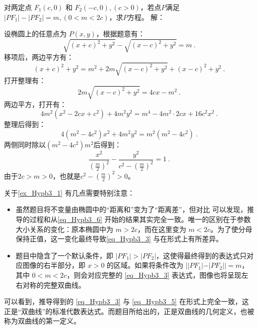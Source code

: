 \begin{example}{对两定点 $F_1(c, 0)$ 和 $F_2(-c, 0),(c>0)$，若点$P$满足$|PF_1| - |PF_2| = m,(0<m <2c)$，求$P$方程。}
解：

设椭圆上的任意点为 $P(x, y)$，根据题意有：
\begin{equation}
\sqrt{(x + c)^2 + y^2} - \sqrt{(x - c)^2 + y^2} = m~.
\end{equation}
移项后，两边平方有：
\begin{equation}
(x + c)^2 + y^2 = m^2 + 2m\sqrt{(x - c)^2 + y^2} + (x - c)^2 + y^2~.
\end{equation}
打开整理有：
\begin{equation}
2m\sqrt{(x - c)^2 + y^2}= 4cx - m^2~.
\end{equation}
两边平方，打开有：
\begin{equation}\label{eq_Hypb3_6}
4m^2(x^2 - 2cx+c^2) + 4m^2y^2= m^4-4m^2\cdot2cx+16c^2x^2~.
\end{equation}
整理后得到：
\begin{equation}
4(m^2 -4c^2)x^2 + 4m^2y^2= m^2(m^2-4c^2)~.
\end{equation}
两侧同时除以$(m^2-4c^2)m^2$后得到：
\begin{equation}\label{eq_Hypb3_3}
\frac{x^2}{\left(\displaystyle\frac{m}{2}\right)^2} -\frac{y^2}{\displaystyle c^2-\left(\frac{m}{2}\right)^2}=1~.
\end{equation}
由于$2c>m>0$，也就是$\displaystyle c^2-\left(\frac{m}{2}\right)^2>0$。
\end{example}

关于\autoref{ex_Hypb3_1} 有几点需要特别注意：
\begin{itemize}
\item 虽然题目将不变量由椭圆中的“距离和”变为了“距离差”，但对比  可以发现，推导的过程和从\autoref{eq_Hypb3_6} 开始的结果其实完全一致。唯一的区别在于参数大小关系的变化：原本椭圆中为 $m > 2c$，而在这里变为 $m < 2c$。为了使分母保持正值，这一变化最终导致\autoref{eq_Hypb3_3} 与在形式上有所差异。
\item 题目中隐含了一个默认条件，即 $|PF_1| > |PF_2|$，这使得最终得到的表达式只对应图像的右半部分，即 $x > 0$ 的区域。如果将条件改为 $||PF_1| - |PF_2|| = m$，其中 $0 < m < 2c$，则会对应完整的 \autoref{eq_Hypb3_3} 表达式，图像也将呈现左右对称的完整双曲线。
\end{itemize}

可以看到，推导得到的 \autoref{eq_Hypb3_3} 与 \autoref{eq_Hypb3_5} 在形式上完全一致，这正是“双曲线”的标准代数表达式。而题目所给出的，正是双曲线的几何定义，也被称为双曲线的第一定义。

